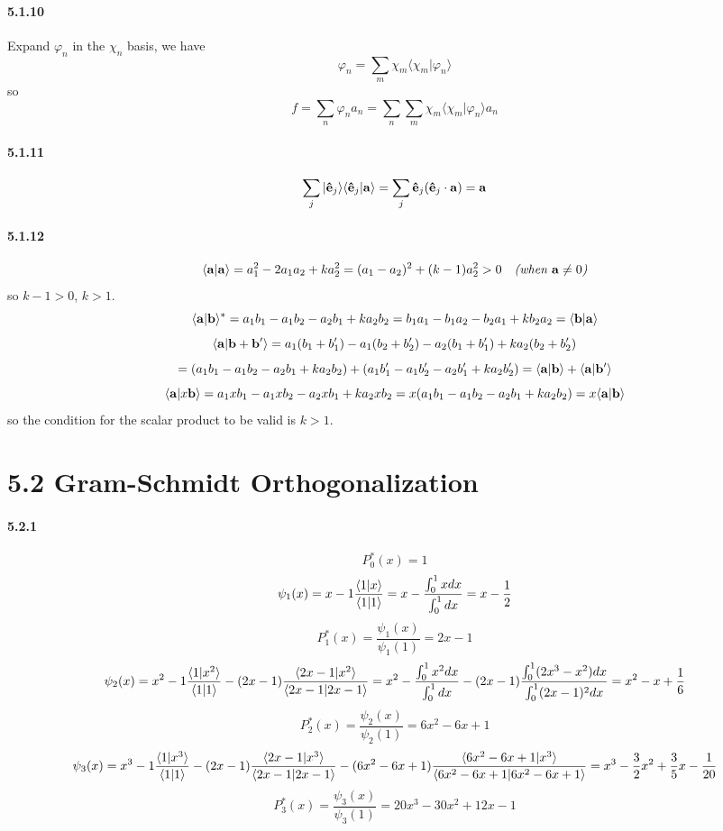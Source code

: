 \documentclass[a4paper]{article}
\begin{document}
\paragraph{5.1.10}
Expand $\varphi_n$ in the $\chi_n$ basis, we have
\[
\varphi_n=\sum_m\chi_m\langle\chi_m|\varphi_n\rangle
\]
so
\[
f=\sum_n\varphi_na_n=\sum_n\sum_m\chi_m\langle\chi_m|\varphi_n\rangle a_n
\]

\paragraph{5.1.11}
\[
\sum_j|\mathbf{\hat{e}}_j\rangle\langle\mathbf{\hat{e}}_j|\mathbf{a}\rangle=\sum_j\mathbf{\hat{e}}_j(\mathbf{\hat{e}}_j\cdot\mathbf{a})=\mathbf{a}
\]

\paragraph{5.1.12}
\[
\langle\mathbf{a}|\mathbf{a}\rangle=a_1^2-2a_1a_2+ka_2^2=(a_1-a_2)^2+(k-1)a_2^2>0\quad\textit{(when $\mathbf{a}\neq0$)}
\]
so $k-1>0$,\; $k>1$.
\[
\langle\mathbf{a}|\mathbf{b}\rangle^*=a_1b_1-a_1b_2-a_2b_1+ka_2b_2=b_1a_1-b_1a_2-b_2a_1+kb_2a_2=\langle\mathbf{b}|\mathbf{a}\rangle
\]
\[
\langle\mathbf{a}|\mathbf{b}+\mathbf{b'}\rangle=a_1(b_1+b'_1)-a_1(b_2+b'_2)-a_2(b_1+b'_1)+ka_2(b_2+b'_2)\]
\[
=(a_1b_1-a_1b_2-a_2b_1+ka_2b_2)+(a_1b'_1-a_1b'_2-a_2b'_1+ka_2b'_2)=\langle\mathbf{a}|\mathbf{b}\rangle+\langle\mathbf{a}|\mathbf{b'}\rangle
\]
\[
\langle\mathbf{a}|x\mathbf{b}\rangle=a_1xb_1-a_1xb_2-a_2xb_1+ka_2xb_2=x(a_1b_1-a_1b_2-a_2b_1+ka_2b_2)=x\langle\mathbf{a}|\mathbf{b}\rangle
\]
so the condition for the scalar product to be valid is $k>1$.

\section*{5.2 Gram-Schmidt Orthogonalization}

\paragraph{5.2.1}
\[
P_0^*(x)=1
\]
\[
\psi_1(x)=x-1\frac{\langle1|x\rangle}{\langle1|1\rangle}=x-\frac{\int_0^1xdx}{\int_0^1dx}=x-\frac{1}{2}
\]
\[
P_1^*(x)=\frac{\psi_1(x)}{\psi_1(1)}=2x-1
\]
\[
\psi_2(x)=x^2-1\frac{\langle1|x^2\rangle}{\langle1|1\rangle}-(2x-1)\frac{\langle2x-1|x^2\rangle}{\langle2x-1|2x-1\rangle}=x^2-\frac{\int_0^1x^2dx}{\int_0^1dx}-(2x-1)\frac{\int_0^1(2x^3-x^2)dx}{\int_0^1(2x-1)^2dx}=x^2-x+\frac{1}{6}
\]
\[
P_2^*(x)=\frac{\psi_2(x)}{\psi_2(1)}=6x^2-6x+1
\]
\[
\psi_3(x)=x^3-1\frac{\langle1|x^3\rangle}{\langle1|1\rangle}-(2x-1)\frac{\langle2x-1|x^3\rangle}{\langle2x-1|2x-1\rangle}-(6x^2-6x+1)\frac{\langle6x^2-6x+1|x^3\rangle}{\langle6x^2-6x+1|6x^2-6x+1\rangle}=x^3-\frac{3}{2}x^2+\frac{3}{5}x-\frac{1}{20}
\]
\[
P_3^*(x)=\frac{\psi_3(x)}{\psi_3(1)}=20x^3-30x^2+12x-1
\]
\end{document}
